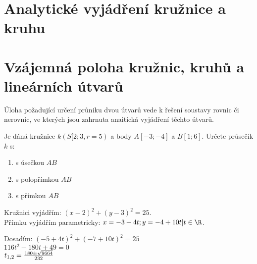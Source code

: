 
\BeginDoc{}
\section{Analytické vyjádření kružnice a kruhu}
\Def
\section{Vzájemná poloha kružnic, kruhů a lineárních útvarů}
\Poz Úloha požadující určení průniku dvou útvarů vede k řešení soustavy rovnic či nerovnic, ve kterých  jsou zahrnuta anaitická vyjádření těchto útvarů.

\Pr

Je dáná kružnice $k(S[2;3,r=5)$ a body $A[-3;-4]$ a $B[1;6]$.
Určete průsečík $k$ s:
\begin{enumerate}
	\item s úsečkou $AB$
	\item s polopřímkou $AB$
	\item s přímkou $AB$
\end{enumerate}

Kružnici vyjádřím: $(x-2)^2 + (y-3)^2 = 25$.\\
Přímku vyjádřím parametricky: $x=-3+4t; y=-4+10t | t\in\R$.

Dosadím: $(-5+4t)^2 + (-7+10t)^2 = 25$\\
$116t^2-180t+49=0$\\
$t_{1,2}=\frac{180\pm\sqrt{9664}}{232} $

